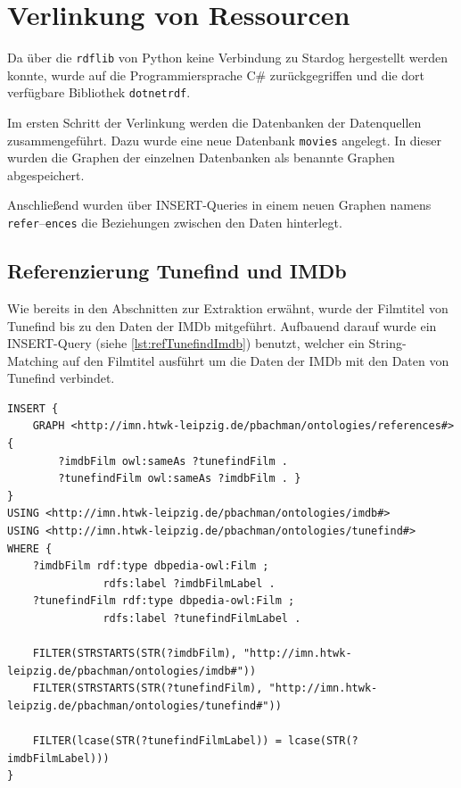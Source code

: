 \documentclass[parskip]{scrartcl}
\begin{document}
\section{Verlinkung von Ressourcen}

Da über die \texttt{rdflib} von Python keine Verbindung zu Stardog hergestellt werden konnte, wurde auf die Programmiersprache C\# zurückgegriffen und die dort verfügbare Bibliothek \texttt{dotnetrdf}.

Im ersten Schritt der Verlinkung werden die Datenbanken der Datenquellen zusammengeführt. Dazu wurde eine neue Datenbank \texttt{movies} angelegt. In dieser wurden die Graphen der einzelnen Datenbanken als benannte Graphen abgespeichert.

Anschließend wurden über INSERT-Queries in einem neuen Graphen namens \texttt{refer}--\texttt{ences} die Beziehungen zwischen den Daten hinterlegt.

\subsection{Referenzierung Tunefind und IMDb}
\label{subsec:refTunefindImdb}

Wie bereits in den Abschnitten zur Extraktion erwähnt, wurde der Filmtitel von Tunefind bis zu den Daten der IMDb mitgeführt. Aufbauend darauf wurde ein INSERT-Query (siehe \autoref{lst:refTunefindImdb}) benutzt, welcher ein String-Matching auf den Filmtitel ausführt um die Daten der IMDb mit den Daten von Tunefind verbindet. 

\begin{lstlisting}[caption={SPARQL-Query zur Referenzierung von Tunefind und IMDb}, label={lst:refTunefindImdb}]
INSERT {
    GRAPH <http://imn.htwk-leipzig.de/pbachman/ontologies/references#> { 
        ?imdbFilm owl:sameAs ?tunefindFilm .
        ?tunefindFilm owl:sameAs ?imdbFilm . }
}
USING <http://imn.htwk-leipzig.de/pbachman/ontologies/imdb#>
USING <http://imn.htwk-leipzig.de/pbachman/ontologies/tunefind#>
WHERE {
    ?imdbFilm rdf:type dbpedia-owl:Film ;
               rdfs:label ?imdbFilmLabel .
    ?tunefindFilm rdf:type dbpedia-owl:Film ;
               rdfs:label ?tunefindFilmLabel .
    
    FILTER(STRSTARTS(STR(?imdbFilm), "http://imn.htwk-leipzig.de/pbachman/ontologies/imdb#"))
    FILTER(STRSTARTS(STR(?tunefindFilm), "http://imn.htwk-leipzig.de/pbachman/ontologies/tunefind#"))
    
    FILTER(lcase(STR(?tunefindFilmLabel)) = lcase(STR(?imdbFilmLabel)))
}
\end{lstlisting}
\end{document}
